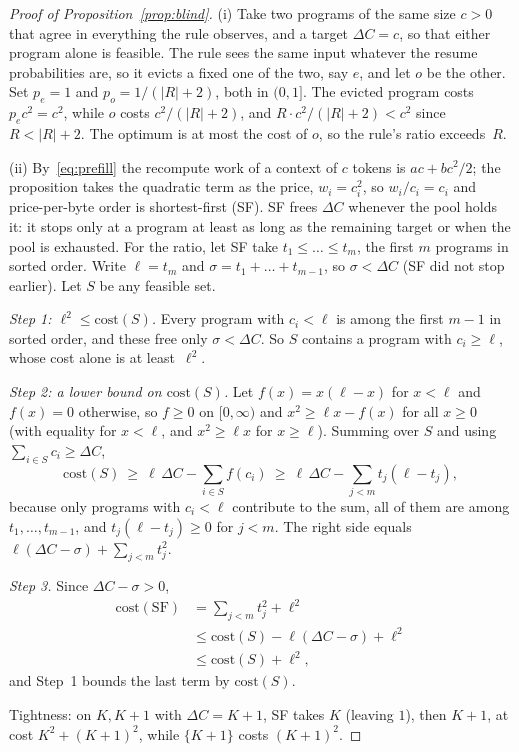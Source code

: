 \documentclass{article}
\theoremstyle{plain}
\theoremstyle{definition}
\theoremstyle{remark}
\begin{document}
\begin{proof}[Proof of Proposition~\ref{prop:blind}]
(i) Take two programs of the same size $c>0$ that agree in everything
the rule observes, and a target $\Delta C=c$, so that either program
alone is feasible. The rule sees the same input whatever the resume
probabilities are, so it evicts a fixed one of the two, say $e$, and let
$o$ be the other. Set $p_e=1$ and $p_o=1/(|R|+2)$, both in $(0,1]$. The
evicted program costs $p_ec^2=c^2$, while $o$ costs
$c^2/(|R|+2)$, and $R\cdot c^2/(|R|+2)<c^2$ since $R<|R|+2$. The
optimum is at most the cost of $o$, so the rule's ratio exceeds~$R$.

(ii) By~\eqref{eq:prefill} the recompute work of a context of $c$
tokens is $ac+bc^2/2$; the proposition takes the quadratic term as the
price, $w_i=c_i^2$, so $w_i/c_i=c_i$ and price-per-byte order is
shortest-first (SF). SF frees $\Delta C$ whenever the pool holds it: it
stops only at a program at least as long as the remaining target or
when the pool is exhausted. For the ratio, let SF take
$t_1\le\dots\le t_m$, the first $m$ programs in sorted order. Write $\ell=t_m$ and $\sigma=t_1+\dots+t_{m-1}$, so $\sigma<\Delta C$ (SF did
not stop earlier). Let $S$ be any feasible set.

\emph{Step 1: $\ell^2\le\mathrm{cost}(S)$.} Every program with $c_i<\ell$ is
among the first $m-1$ in sorted order, and these free only $\sigma<\Delta C$.
So $S$ contains a program with $c_i\ge \ell$, whose cost alone is at
least~$\ell^2$.

\emph{Step 2: a lower bound on $\mathrm{cost}(S)$.} Let
$f(x)=x(\ell-x)$ for $x<\ell$ and $f(x)=0$ otherwise, so $f\ge0$ on $[0,\infty)$
and $x^2\ge \ell x-f(x)$ for all $x\ge0$ (with equality for $x<\ell$, and
$x^2\ge \ell x$ for $x\ge \ell$). Summing over $S$ and using
$\sum_{i\in S}c_i\ge\Delta C$,
\[
  \mathrm{cost}(S)\ \ge\ \ell\,\Delta C-\sum_{i\in S}f(c_i)
  \ \ge\ \ell\,\Delta C-\sum_{j<m}t_j(\ell-t_j),
\]
because only programs with $c_i<\ell$ contribute to the sum, all of them
are among $t_1,\dots,t_{m-1}$, and $t_j(\ell-t_j)\ge0$ for $j<m$. The right
side equals $\ell(\Delta C-\sigma)+\sum_{j<m}t_j^2$.

\emph{Step 3.} Since $\Delta C-\sigma>0$,
\begin{align*}
  \mathrm{cost}(\mathrm{SF})&=\textstyle\sum_{j<m}t_j^2+\ell^2\\
  &\le \mathrm{cost}(S)-\ell(\Delta C-\sigma)+\ell^2\\
  &\le \mathrm{cost}(S)+\ell^2,
\end{align*}
and Step~1 bounds the last term by $\mathrm{cost}(S)$.

Tightness: on $K,K+1$ with $\Delta C=K+1$, SF takes $K$ (leaving $1$), then
$K+1$, at cost $K^2+(K+1)^2$, while $\{K+1\}$ costs $(K+1)^2$.
\end{proof}
\end{document}
